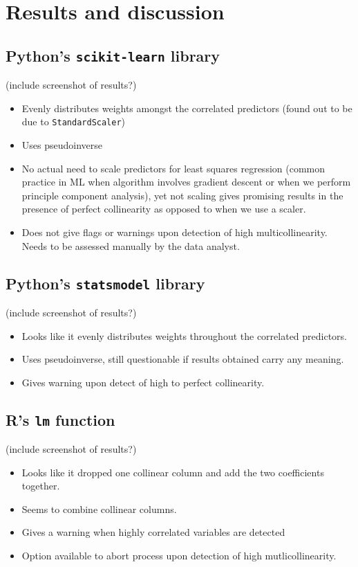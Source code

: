 \documentclass[12pt]{article}
\begin{document}
	
	\section{Results and discussion}
	\subsection{Python's \texttt{scikit-learn} library}
	(include screenshot of results?)
	\begin{itemize}
		\item Evenly distributes weights amongst the correlated predictors (found out to be due to \texttt{StandardScaler})
		\item Uses pseudoinverse
		\item No actual need to scale predictors for least squares regression (common practice in ML when algorithm involves gradient descent or when we perform principle component analysis), yet not scaling gives promising results in the presence of perfect collinearity as opposed to when we use a scaler. 
		\item Does not give flags or warnings upon detection of high multicollinearity. Needs to be assessed manually by the data analyst.
	\end{itemize}
	
	\subsection{Python's \texttt{statsmodel} library}
	(include screenshot of results?)
	\begin{itemize}
		\item Looks like it evenly distributes weights throughout the correlated predictors.
		\item Uses pseudoinverse, still questionable if results obtained carry any meaning.
		\item Gives warning upon detect of high to perfect collinearity.
	\end{itemize}
	
	\subsection{R's \texttt{lm} function}
	(include screenshot of results?)
	
	\begin{itemize}
		\item Looks like it dropped one collinear column and add the two coefficients together.
		\item Seems to combine collinear columns.
		\item Gives a warning when highly correlated variables are detected
		\item Option available to abort process upon detection of high mutlicollinearity.
	\end{itemize}
	
\end{document}
